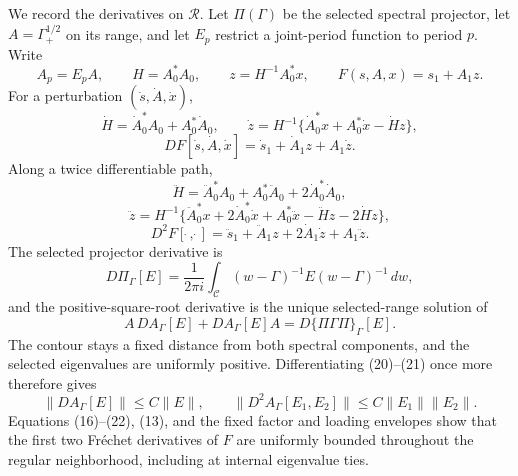 We record the derivatives on \(\mathcal R\).  Let \(\Pi(\Gamma)\) be the
selected spectral projector, let \(A=\Gamma_+^{1/2}\) on its range, and let
\(E_p\) restrict a joint-period function to period \(p\).  Write
\[
 A_p=E_pA,\qquad H=A_0^*A_0,\qquad
 z=H^{-1}A_0^*x,\qquad F(s,A,x)=s_1+A_1z.                 \tag{15}
\]
For a perturbation \((\dot s,\dot A,\dot x)\),
\[
 \dot H=\dot A_0^*A_0+A_0^*\dot A_0,
 \qquad
 \dot z=H^{-1}\{\dot A_0^*x+A_0^*\dot x-\dot Hz\},     \tag{16}
\]
\[
 DF[\dot s,\dot A,\dot x]
 =\dot s_1+\dot A_1z+A_1\dot z.                           \tag{17}
\]
Along a twice differentiable path,
\[
 \ddot H=\ddot A_0^*A_0+A_0^*\ddot A_0
          +2\dot A_0^*\dot A_0,
\]
\[
 \ddot z=H^{-1}\{\ddot A_0^*x+2\dot A_0^*\dot x
 +A_0^*\ddot x-\ddot Hz-2\dot H\dot z\},                \tag{18}
\]
\[
 D^2F[\dot{\ },\dot{\ }]
 =\ddot s_1+\ddot A_1z+2\dot A_1\dot z+A_1\ddot z.     \tag{19}
\]
The selected projector derivative is
\[
 D\Pi_\Gamma[E]
 =\frac{1}{2\pi i}\int_{\mathscr C}
 (w-\Gamma)^{-1}E(w-\Gamma)^{-1}\,dw,                   \tag{20}
\]
and the positive-square-root derivative is the unique selected-range solution
of
\[
 A\,DA_\Gamma[E]+DA_\Gamma[E]A
 =D\{\Pi\Gamma\Pi\}_\Gamma[E].                           \tag{21}
\]
The contour stays a fixed distance from both spectral components, and the
selected eigenvalues are uniformly positive.  Differentiating (20)--(21) once
more therefore gives
\[
 \|DA_\Gamma[E]\|\leq C\|E\|,
 \qquad
 \|D^2A_\Gamma[E_1,E_2]\|
 \leq C\|E_1\|\|E_2\|.                                  \tag{22}
\]
Equations (16)--(22), (13), and the fixed factor and loading envelopes show that
the first two Fr\'echet derivatives of \(F\) are uniformly bounded throughout
the regular neighborhood, including at internal eigenvalue ties.

